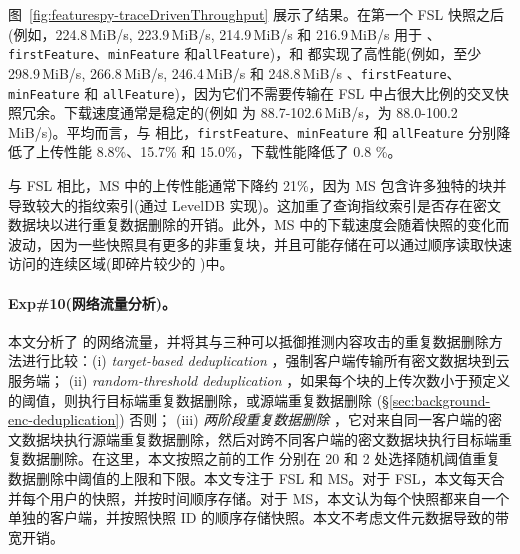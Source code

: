图~\ref{fig:featurespy-traceDrivenThroughput} 展示了结果。在第一个 FSL 快照之后(例如，224.8\,MiB/s, 223.9\,MiB/s, 214.9\,MiB/s 和 216.9\,MiB/s 用于 \sysnameS、{\tt firstFeature}、{\tt minFeature} 和{\tt allFeature})，\sysnameS 和 \prototype 都实现了高性能(例如，至少 298.9\,MiB/s, 266.8\,MiB/s, 246.4\,MiB/s 和 248.8\,MiB/s \sysnameS、{\tt firstFeature}、{\tt minFeature} 和 {\tt allFeature})，因为它们不需要传输在 FSL 中占很大比例的交叉快照冗余。下载速度通常是稳定的(例如 \sysnameS 为 88.7-102.6\,MiB/s，\prototype 为 88.0-100.2\,MiB/s)。平均而言，与 \sysnameS 相比，{\tt firstFeature}、{\tt minFeature} 和 {\tt allFeature} 分别降低了上传性能 8.8\%、15.7\% 和 15.0\%，下载性能降低了 0.8 \%。

与 FSL 相比，MS 中的上传性能通常下降约 21\%，因为 MS 包含许多独特的块并导致较大的指纹索引(通过 LevelDB \cite{leveldb} 实现)。这加重了查询指纹索引是否存在密文数据块以进行重复数据删除的开销。此外，MS 中的下载速度会随着快照的变化而波动，因为一些快照具有更多的非重复块，并且可能存储在可以通过顺序读取快速访问的连续区域(即碎片较少的 \cite{lillibridge13})中。


\paragraph*{Exp\#10(网络流量分析)。}
本文分析了 \prototype 的网络流量，并将其与三种可以抵御推测内容攻击的重复数据删除方法进行比较：(i) {\em target-based deduplication} \cite{harnik2010side}，强制客户端传输所有密文数据块到云服务端； (ii) {\em random-threshold deduplication} \cite{harnik2010side}，如果每个块的上传次数小于预定义的阈值，则执行目标端重复数据删除，或源端重复数据删除 (\S\ref{sec:background-enc-deduplication}) 否则； (iii) {\em 两阶段重复数据删除} \cite{li15}，它对来自同一客户端的密文数据块执行源端重复数据删除，然后对跨不同客户端的密文数据块执行目标端重复数据删除。在这里，本文按照之前的工作 \cite{harnik2010side} 分别在 20 和 2 处选择随机阈值重复数据删除中阈值的上限和下限。本文专注于 FSL 和 MS。对于 FSL，本文每天合并每个用户的快照，并按时间顺序存储。对于 MS，本文认为每个快照都来自一个单独的客户端，并按照快照 ID 的顺序存储快照。本文不考虑文件元数据导致的带宽开销。


